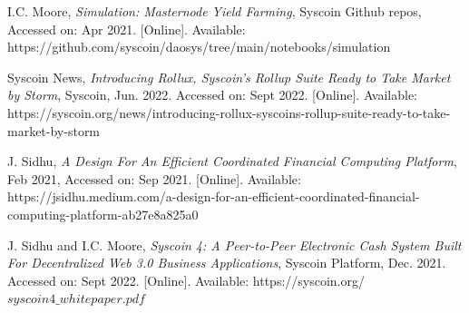 \documentclass[journal,twocolumn,12pt]{ieeesyscoin}
\begin{document}
\begin{thebibliography}{00}
 I.C. Moore, \textit{Simulation: Masternode Yield Farming}, Syscoin Github repos, Accessed on: Apr 2021.  [Online]. Available: https://github.com/syscoin/daosys/tree/main/notebooks/simulation

 Syscoin News, \textit{Introducing Rollux, Syscoin's Rollup Suite Ready to Take Market by Storm}, Syscoin, Jun. 2022. Accessed on: Sept 2022.  [Online]. Available: https://syscoin.org/news/introducing-rollux-syscoins-rollup-suite-ready-to-take-market-by-storm

 J. Sidhu, \textit{A Design For An Efficient Coordinated Financial Computing Platform}, Feb 2021, Accessed on: Sep 2021.  [Online]. Available:  https://jsidhu.medium.com/a-design-for-an-efficient-coordinated-financial-computing-platform-ab27e8a825a0

 J. Sidhu and I.C. Moore, \textit{Syscoin 4: A Peer-to-Peer Electronic Cash System Built For Decentralized
Web 3.0 Business Applications}, Syscoin Platform, Dec. 2021. Accessed on: Sept 2022. [Online]. Available: https://syscoin.org/$syscoin4\_whitepaper.pdf$



\end{thebibliography}


\EOD
\end{document}
